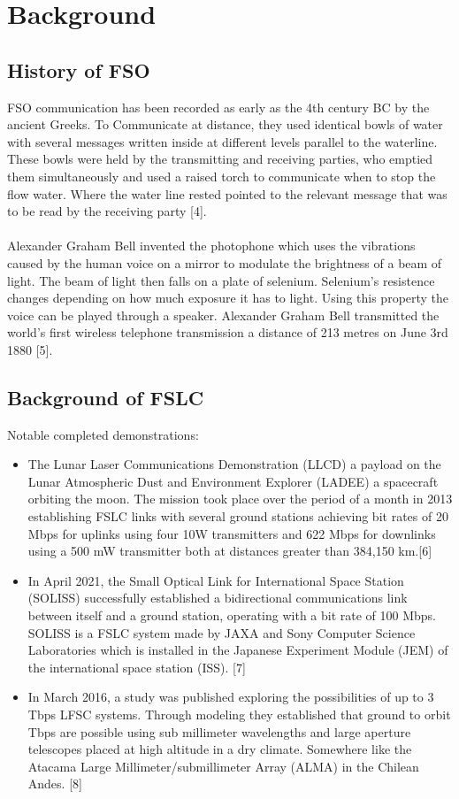 \documentclass[conference]{IEEEtran}
\begin{document}
\section{Background}

\subsection{History of FSO}

FSO communication has been recorded as early as the 4th century BC by the ancient Greeks.  To Communicate at distance, they used identical bowls of water with several messages written inside at different levels parallel to the waterline. These bowls were held by the transmitting and receiving parties, who emptied them simultaneously and used a raised torch to communicate when to stop the flow water. Where the water line rested pointed to the relevant message that was to be read by the receiving party [4].
\\\\
Alexander Graham Bell invented the photophone which uses the vibrations caused by the human voice on a mirror to modulate the brightness of a beam of light. The beam of light then falls on a plate of selenium. Selenium’s resistence changes depending on how much exposure it has to light. Using this property the voice can be played through a speaker. Alexander Graham Bell transmitted the world’s first wireless telephone transmission a distance of 213 metres on June 3rd 1880 [5].

\subsection{Background of FSLC}

Notable completed demonstrations:

\begin{itemize}
    \item The Lunar Laser Communications Demonstration (LLCD) a payload on the Lunar Atmospheric Dust and Environment Explorer (LADEE) a spacecraft orbiting the moon. The mission took place over the period of a month in 2013 establishing FSLC links with several ground stations achieving bit rates of 20 Mbps for uplinks using four 10W transmitters and 622 Mbps for downlinks using a 500 mW transmitter both at distances greater than 384,150 km.[6]
    \item In April 2021, the Small Optical Link for International Space Station (SOLISS) successfully established a bidirectional communications link between itself and a ground station, operating with a bit rate of 100 Mbps. SOLISS is a FSLC system made by JAXA and Sony Computer Science Laboratories which is installed in the Japanese Experiment Module (JEM) of the international space station (ISS). [7]
    \item In March 2016, a study was published exploring the possibilities of up to 3 Tbps LFSC systems. Through modeling they established that ground to orbit Tbps are possible using sub millimeter wavelengths and large aperture telescopes placed at high altitude in a dry climate. Somewhere like the Atacama Large Millimeter/submillimeter Array (ALMA) in the Chilean Andes. [8]
\end{itemize}
\end{document}
